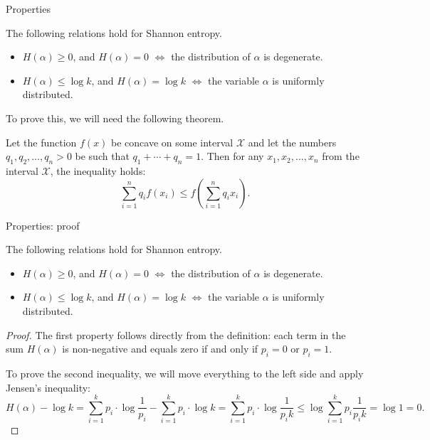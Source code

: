 \documentclass[aspectratio=169]{beamer}
\newcommand{\seqn}[2]{{#1}_1,{#1}_2,\dotsc,{#1}_{#2}}
\begin{document}
\begin{frame}{Properties}
    \begin{lemma}\label{lm:entropy-properties}
    The following relations hold for Shannon entropy.
    \begin{itemize}
        \item \(H(\alpha) \ge 0\), and \(H(\alpha) = 0\) \(\iff\) the distribution of \(\alpha\) is degenerate.

        \item \(H(\alpha) \le \log k\), and \(H(\alpha) = \log k\) \(\iff\) the variable \(\alpha\) is uniformly distributed.

    \end{itemize}
\end{lemma}
\medskip\pause

To prove this, we will need the following theorem.

\begin{theorem}
    Let the function \(f(x)\) be concave on some interval \(\mathcal{X}\) and let the numbers \(\seqn{q}{n} > 0\) be such that \(q_1 + \dotsb + q_n = 1\). Then for any \(\seqn{x}{n}\) from the interval \(\mathcal{X}\), the inequality holds:
    \[
    \sum_{i=1}^{n} q_{i} f(x_{i}) \leq f\left(\sum_{i=1}^{n} q_{i} x_{i}\right).
    \]
\end{theorem}



\end{frame}

\begin{frame}{Properties: proof}
        \begin{lemma}\label{lm:entropy-properties}
        The following relations hold for Shannon entropy.
        \begin{itemize}
            \item \(H(\alpha) \ge 0\), and \(H(\alpha) = 0\) \(\iff\) the distribution of \(\alpha\) is degenerate.

            \item \(H(\alpha) \le \log k\), and \(H(\alpha) = \log k\) \(\iff\) the variable \(\alpha\) is uniformly distributed.

        \end{itemize}
    \end{lemma}
    \begin{proof}
        The first property follows directly from the definition: each term in the sum \(H(\alpha)\) is non-negative and equals zero if and only if \(p_i = 0\) or \(p_i = 1\).

        To prove the second inequality, we will move everything to the left side and apply Jensen's inequality:
        \[
        H(\alpha) - \log k
        = \sum_{i=1}^k p_i \cdot \log \frac{1}{p_i} - \sum_{i=1}^k p_i \cdot \log k
        = \sum_{i=1}^k p_i \cdot \log \frac{1}{p_i k}
        \le \log\sum_{i=1}^k p_i \frac{1}{p_i k} = \log 1 = 0.
        \]
    \end{proof}
\end{frame}
\end{document}
